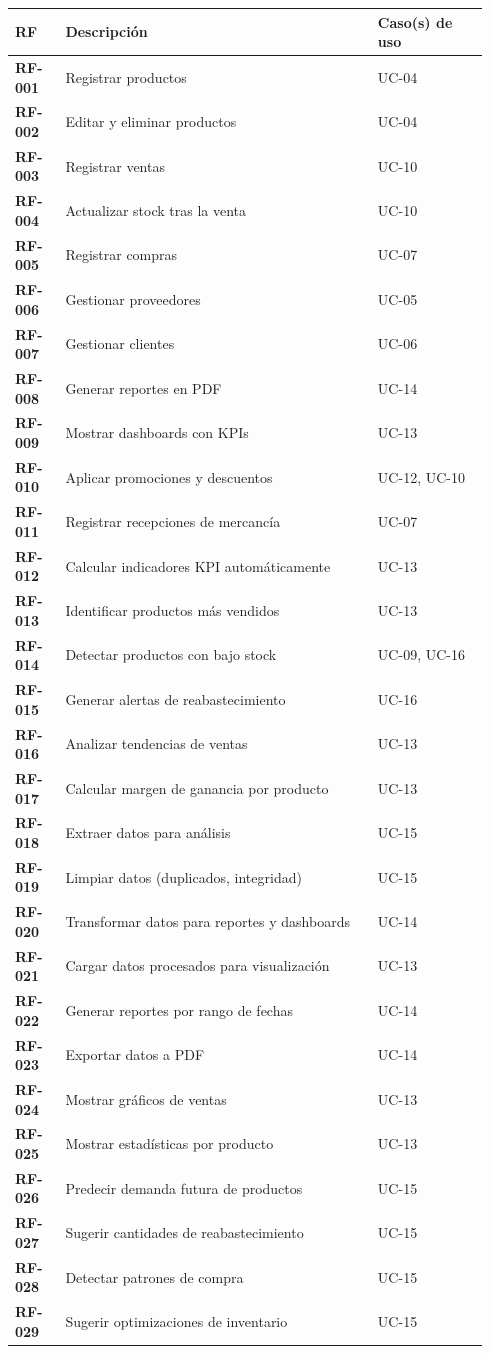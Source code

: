 \documentclass[11pt]{article}
\begin{document}
\begin{center}\footnotesize
\setlength{\LTpre}{0.3ex}
\begin{longtable}{@{}>{\bfseries}p{0.10\linewidth} >{\raggedright\arraybackslash}p{0.62\linewidth} >{\raggedright\arraybackslash}p{0.22\linewidth}@{}}
\toprule
\normalfont\bfseries RF & \normalfont\bfseries Descripción & \normalfont\bfseries Caso(s) de uso \\ \midrule \endhead
RF-001 & Registrar productos & UC-04 \\
RF-002 & Editar y eliminar productos & UC-04 \\
RF-003 & Registrar ventas & UC-10 \\
RF-004 & Actualizar stock tras la venta & UC-10 \\
RF-005 & Registrar compras & UC-07 \\
RF-006 & Gestionar proveedores & UC-05 \\
RF-007 & Gestionar clientes & UC-06 \\
RF-008 & Generar reportes en PDF & UC-14 \\
RF-009 & Mostrar dashboards con KPIs & UC-13 \\
RF-010 & Aplicar promociones y descuentos & UC-12, UC-10 \\
RF-011 & Registrar recepciones de mercancía & UC-07 \\
RF-012 & Calcular indicadores KPI automáticamente & UC-13 \\
RF-013 & Identificar productos más vendidos & UC-13 \\
RF-014 & Detectar productos con bajo stock & UC-09, UC-16 \\
RF-015 & Generar alertas de reabastecimiento & UC-16 \\
RF-016 & Analizar tendencias de ventas & UC-13 \\
RF-017 & Calcular margen de ganancia por producto & UC-13 \\
RF-018 & Extraer datos para análisis & UC-15 \\
RF-019 & Limpiar datos (duplicados, integridad) & UC-15 \\
RF-020 & Transformar datos para reportes y dashboards & UC-14 \\
RF-021 & Cargar datos procesados para visualización & UC-13 \\
RF-022 & Generar reportes por rango de fechas & UC-14 \\
RF-023 & Exportar datos a PDF & UC-14 \\
RF-024 & Mostrar gráficos de ventas & UC-13 \\
RF-025 & Mostrar estadísticas por producto & UC-13 \\
RF-026 & Predecir demanda futura de productos & UC-15 \\
RF-027 & Sugerir cantidades de reabastecimiento & UC-15 \\
RF-028 & Detectar patrones de compra & UC-15 \\
RF-029 & Sugerir optimizaciones de inventario & UC-15 \\
\bottomrule
\end{longtable}
\end{center}
\end{document}
